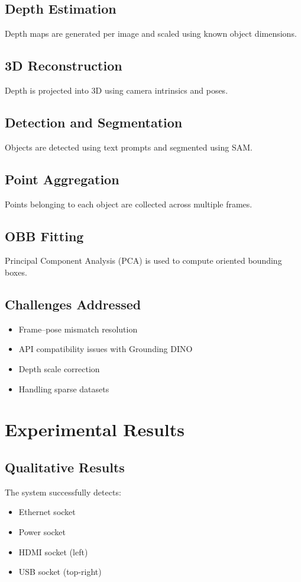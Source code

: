 \documentclass[11pt]{article}
\begin{document}
\subsection{Depth Estimation}
Depth maps are generated per image and scaled using known object dimensions.

\subsection{3D Reconstruction}
Depth is projected into 3D using camera intrinsics and poses.

\subsection{Detection and Segmentation}
Objects are detected using text prompts and segmented using SAM.

\subsection{Point Aggregation}
Points belonging to each object are collected across multiple frames.

\subsection{OBB Fitting}
Principal Component Analysis (PCA) is used to compute oriented bounding boxes.

\subsection{Challenges Addressed}
\begin{itemize}
\item Frame–pose mismatch resolution
\item API compatibility issues with Grounding DINO
\item Depth scale correction
\item Handling sparse datasets
\end{itemize}

\section{Experimental Results}

\subsection{Qualitative Results}
The system successfully detects:
\begin{itemize}
\item Ethernet socket
\item Power socket
\item HDMI socket (left)
\item USB socket (top-right)
\end{itemize}
\end{document}
